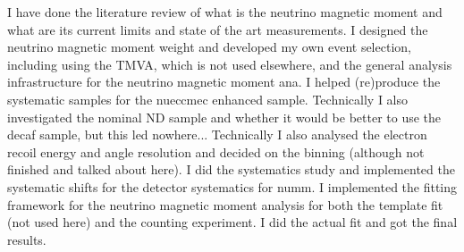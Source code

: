 I have done the literature review of what is the neutrino magnetic moment and what are its current limits and state of the art measurements. I designed the neutrino magnetic moment weight and developed my own event selection, including using the TMVA, which is not used elsewhere, and the general analysis infrastructure for the neutrino magnetic moment ana. I helped (re)produce the systematic samples for the nueccmec enhanced sample. Technically I also investigated the nominal ND sample and whether it would be better to use the decaf sample, but this led nowhere... Technically I also analysed the electron recoil energy and angle resolution and decided on the binning (although not finished and talked about here). I did the systematics study and implemented the systematic shifts for the detector systematics for numm. I implemented the fitting framework for the neutrino magnetic moment analysis for both the template fit (not used here) and the counting experiment. I did the actual fit and got the final results.